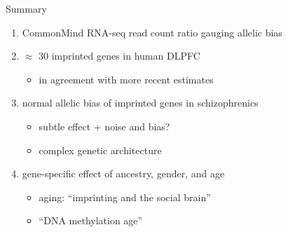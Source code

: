 \documentclass{beamer}
\begin{document}
\begin{frame}{Summary}
\begin{enumerate}
\item CommonMind RNA-seq read count ratio gauging allelic bias
\item<2-> \(\approx\) 30 imprinted genes in human DLPFC
\begin{itemize}
\item in agreement with more recent estimates
\end{itemize}
\item<3-> normal allelic bias of imprinted genes in schizophrenics
\begin{itemize}
\item subtle effect + noise and bias?
\item complex genetic architecture
\end{itemize}
\item<4-> gene-specific effect of ancestry, gender, and age 
\begin{itemize}
\item aging: ``imprinting and the social brain''
\item ``DNA methylation age'' 
\end{itemize}
\end{enumerate}
\end{frame}
\end{document}
